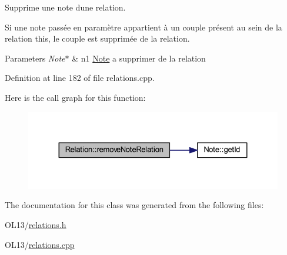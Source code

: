 Supprime une note d\textquotesingle{}une relation. 

Si une note passée en paramètre appartient à un couple présent au sein de la relation this, le couple est supprimée de la relation. 
\begin{DoxyParams}{Parameters}
{\em Note$\ast$} & n1 \hyperlink{class_note}{Note} a supprimer de la relation \\
\hline
\end{DoxyParams}


Definition at line 182 of file relations.\+cpp.

Here is the call graph for this function\+:\nopagebreak
\begin{figure}[H]
\begin{center}
\leavevmode
\includegraphics[width=324pt]{class_relation_a8f25fe0ab5bf722eb08d2dd31e99c7f4_cgraph}
\end{center}
\end{figure}


The documentation for this class was generated from the following files\+:\begin{DoxyCompactItemize}
\item 
O\+L13/\hyperlink{relations_8h}{relations.\+h}\item 
O\+L13/\hyperlink{relations_8cpp}{relations.\+cpp}\end{DoxyCompactItemize}
